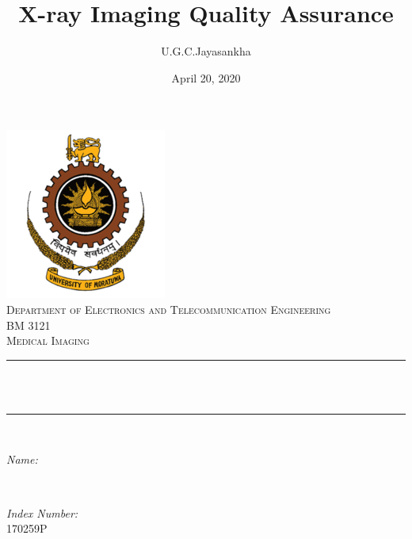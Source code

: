 \documentclass[12pt]{article}
\title{X-ray Imaging Quality Assurance}					%
\author{U.G.C.Jayasankha}								%
\date{April 20, 2020}											%
\makeatletter
\let\thetitle\@title
\let\theauthor\@author
\let\thedate\@date
\makeatother
\begin{document}

\begin{titlepage}
	\centering
    \vspace*{0.5 cm}
    \includegraphics[scale = 0.8]{University_of_Moratuwa_logo.png}\\[1.0 cm]	%
    \textsc{\Large Department of Electronics and Telecommunication Engineering}\\[0.8 cm]
	\textsc{\large BM 3121}\\[0.5 cm]				%
	\textsc{\Large Medical Imaging}\\[0.5 cm]				%
	\rule{\linewidth}{0.2 mm} \\[0.4 cm]
	{ \huge \bfseries \thetitle}\\
	\rule{\linewidth}{0.2 mm} \\[1.5 cm]
	
	\begin{minipage}{0.4\textwidth}
		\begin{flushleft} \large
			\emph{Name:}\\
			\theauthor
			\end{flushleft}
			\end{minipage}~
			\begin{minipage}{0.4\textwidth}
			\begin{flushright} \large
			\emph{Index Number:} \\
			170259P									%
		\end{flushright}
	\end{minipage}\\[2 cm]
	
	{\large \thedate}\\[2 cm]
 
	\vfill
	
\end{titlepage}
\end{document}
